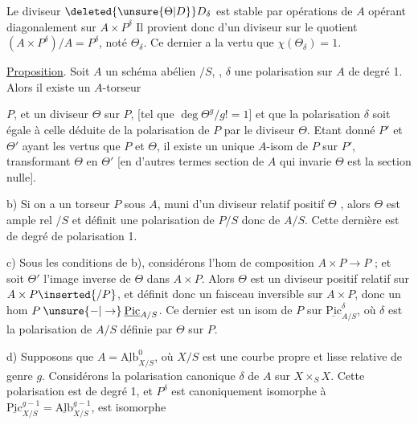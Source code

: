  \deleted{\unsure{$\Theta$}} Le diviseur $\deleted{\unsure{\Theta|D}}D_\delta$ est stable par opérations de $A$ opérant diagonalement sur $A\times P^\delta$  Il provient donc d'un diviseur sur le quotient $(A\times P^\delta)/A=P^\delta$, noté  $\Theta_\delta$. Ce dernier a la vertu que $\chi(\Theta_\delta)=1$.

\uline{Proposition}. Soit $A$ un schéma abélien $/S$, ,  $\delta$ une polarisation sur $A$ de degré 1. Alors il existe un $A$-torseur

$P$, et un diviseur  $\Theta$ sur $P$, [tel que $\deg\Theta^g/g!=1$] et que la polarisation $\delta$ soit égale à celle déduite de la polarisation de $P$ par le diviseur $\Theta$. Etant donné  $P'$ et $\Theta'$ ayant les  vertus que $P$ et $\Theta$, il existe un unique $A$-isom de $P$ sur $P'$, transformant $\Theta$ en $\Theta'$ [en d'autres termes   section de $A$ qui invarie $\Theta$ est la section nulle].

b) Si on a un torseur $P$ sous $A$, muni d'un diviseur relatif positif $\Theta$ , alors $\Theta$ est ample rel $/S$ et définit  une polarisation de $P/S$ donc  de $A/S$. Cette dernière est de degré de polarisation 1.

c) Sous les conditions de b), considérons l'hom de composition $A\times P\longrightarrow P$ ; et soit $\Theta'$ l'image inverse de $\Theta$ dans $A\times P$. Alors $\Theta$ est un diviseur positif relatif sur $A\times P\inserted{/P}$, et définit donc un  faisceau inversible sur $A\times P$, donc un hom $P\mathbin{\unsure{-|\to}}\underline{\mathrm{Pic}}_{A/S}$. Ce dernier est un isom de $P$ sur $\underline{\mathrm{Pic}}^\delta_{A/S}$, où $\delta$ est la polarisation de $A/S$ définie par \deleted{$\unsure{\delta}$} $\Theta$ sur $P$.

d) Supposons que $A=\underline{\mathrm{Alb}}^0_{X/S}$, où $X/S$ est une courbe propre et lisse relative de genre $g$.  Considérons la polarisation canonique $\delta$ de $A$  sur $X\times_S X$. Cette polarisation est de degré 1, et $P^\delta$ est canoniquement isomorphe à  $\underline{\mathrm{Pic}}^{g-1}_{X/S}=\underline{\mathrm{Alb}}^{g-1}_{X/S}$, est isomorphe 

